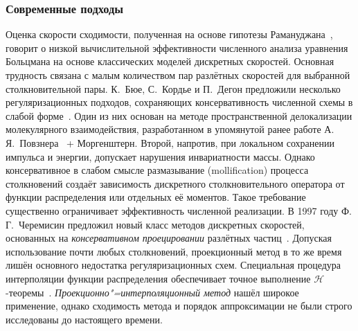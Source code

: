 \subsubsection{Современные подходы}



Оценка скорости сходимости, полученная на основе гипотезы Рамануджана~\cite{Ramanujan1916},
говорит о низкой вычислительной эффективности численного анализа уравнения Больцмана
на основе классических моделей дискретных скоростей. Основная трудность связана с малым количеством
пар разлётных скоростей для выбранной столкновительной пары.
К.~Бюе, С.~Кордье и П.~Дегон предложили несколько регуляризационных подходов,
сохраняющих консервативность численной схемы в слабой форме~\cite{Buet1998}.
Один из них основан на методе пространственной делокализации молекулярного взаимодействия,
разработанном в упомянутой ранее работе А.\,Я.~Повзнера~\cite{Povzner1962} + Моргенштерн.
Второй, напротив, при локальном сохранении импульса и энергии, допускает нарушения инвариатности массы.
Однако консервативное в слабом смысле размазывание (mollification) процесса столкновений
создаёт зависимость дискретного столкновительного оператора от функции распределения
или отдельных её моментов. Такое требование существенно ограничивает эффективность численной реализации.
В 1997 году Ф.\,Г.~Черемисин предложил новый класс методов дискретных скоростей,
основанных на \emph{консервативном проецировании} разлётных частиц~\cite{Tcheremissine1997, Tcheremissine1998}.
Допуская использование почти любых столкновений,
проекционный метод в то же время лишён основного недостатка регуляризационных схем.
Специальная процедура интерполяции функции распределения обеспечивает точное выполнение \(\mathcal{H}\)-теоремы~\cite{Tcheremissine2000}.
\emph{Проекционно"=интерполяционный метод} нашёл широкое применение,
однако сходимость метода и порядок аппроксимации не были строго исследованы до настоящего времени.


